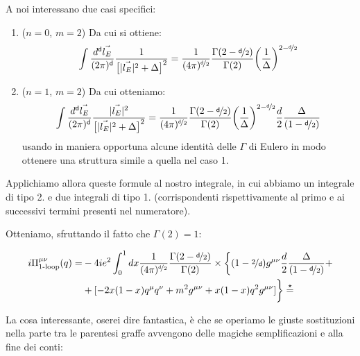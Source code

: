 \documentclass[../main.tex]{subfiles}
\begin{document}
A noi interessano due casi specifici:
\begin{enumerate}
    \item ($n=0$, $m=2$) Da cui si ottiene:
        \begin{equation}
            \int \frac{d^\mathsf{d} \Vec{l_E}}{(2\pi)^\mathsf{d}} \frac{1}{\bigl[|\Vec{l_E}|^2 + \Delta\bigr]^2} = \frac{1}{(4\pi)^{\nicefrac{\mathsf d}{2}}} \frac{\Gamma(2-\nicefrac{\mathsf d}{2})}{\Gamma(2)}\bigg(\frac{1}{\Delta}\bigg)^{2-\nicefrac{\mathsf d}{2}}
            \label{eq:euclidean_integral_n0m2}
        \end{equation}
    
    \item ($n=1$, $m=2$) Da cui otteniamo:
        \begin{equation}
            \int \frac{d^\mathsf{d} \Vec{l_E}}{(2\pi)^\mathsf{d}} \frac{|\Vec{l_E}|^2}{\bigl[|\Vec{l_E}|^2 + \Delta\bigr]^2} = \frac{1}{(4\pi)^{\nicefrac{\mathsf d}{2}}} \frac{\Gamma(2-\nicefrac{\mathsf d}{2})}{\Gamma(2)}\bigg(\frac{1}{\Delta}\bigg)^{2-\nicefrac{\mathsf d}{2}} \frac{d}{2} \frac{\Delta}{(1-\nicefrac{\mathsf d}{2})}
            \label{eq:euclidean_integral_n1m2}
        \end{equation}
        usando in maniera opportuna alcune identità delle $\Gamma$ di Eulero in modo ottenere una struttura simile a quella nel caso 1. 
\end{enumerate} 

Applichiamo allora queste formule al nostro integrale, in cui abbiamo un integrale di tipo 2. e due integrali di tipo 1. (corrispondenti rispettivamente al primo e ai successivi termini presenti nel numeratore).

Otteniamo, sfruttando il fatto che $\Gamma(2)=1$:

\begin{align*}
    i\Pi^{\mu\nu}_{\text{1-loop}}(q)  = & - 4ie^2\int_0^1dx \frac{1}{(4\pi)^{\nicefrac{\mathsf d}{2}}} \frac{\Gamma(2-\nicefrac{\mathsf d}{2})}{\Gamma(2)} \times \bigg\{ (1 - \nicefrac{2}{\mathsf d})g^{\mu\nu} \frac{d}{2}\frac{\Delta}{(1 - \nicefrac{\mathsf d}{2})} + \\
    &+ [-2x(1-x)q^\mu q^\nu + m^2g^{\mu\nu}+x(1-x)q^2g^{\mu\nu}]\bigg\} \overset{\star}{=}
\end{align*}

La cosa interessante, oserei dire fantastica, è che se operiamo le giuste sostituzioni nella parte tra le parentesi graffe avvengono delle magiche semplificazioni e alla fine dei conti:
\end{document}
